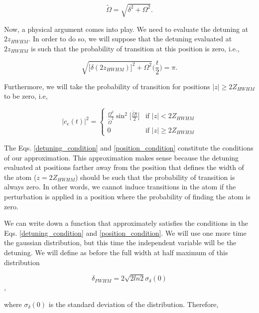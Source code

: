 \documentclass{article}
\begin{document}
\begin{equation}
  \tilde{\Omega} = \sqrt{\delta^{2} + \Omega^{2}}.
\end{equation}

Now, a physical argument comes into play. We need to evaluate the detuning at $2z_{HWHM}$. In order to do so, we will suppose that the detuning evaluated at $2z_{HWHM}$ is such that the probability of transition at this position  is zero, i.e.,

\begin{equation}\label{detuning_condition}
\sqrt{\big[ \delta (2z_{HWHM}) \big]^{2} + \Omega^{2}} \bigg( \frac{t}{2} \bigg) = \pi.
\end{equation}

Furthermore, we will take the probability of transition for positions $|z| \ge 2 Z_{HWHM}$ to be zero, i.e,

\begin{equation}\label{position_condition}
|c_{e}(t)|^{2} =
    \begin{cases}
        \frac{\Omega^{2}}{\tilde{\Omega}^{2}} \sin^{2}\bigg[\frac{\tilde{\Omega} t}{2} \bigg] & \text{if } |z| < 2 Z_{HWHM}\\
        0 & \text{if } |z| \ge 2 Z_{HWHM}
    \end{cases}
\end{equation}

The Eqs. \ref{detuning_condition} and \ref{position_condition} constitute the conditions of our approximation. This approximation makes sense because the detuning evaluated at positions farther away from the position that defines the width of the atom ($z=2Z_{HWHM}$) should be such that the probability of transition is always zero. In other words, we cannot induce transitions in the atom if the perturbation is applied in a position where the probability of finding the atom is zero.

We can write down a function that approximately satisfies the conditions in the Eqs. \ref{detuning_condition} and \ref{position_condition}. We will use one more time the gaussian distribution, but this time the independent variable will be the detuning. We will define as before the full width at half maximum of this distribution

\begin{equation}\label{FWHM_normal_distribution}
\delta_{FWHM} = 2\sqrt{2ln2} \sigma_{\delta}(0)
\end{equation},

where $\sigma_{\delta}(0)$ is the standard deviation of the distribution.
Therefore,
\end{document}

